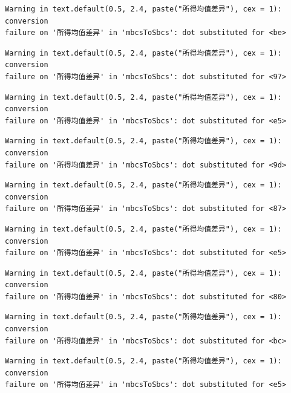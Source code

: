 \documentclass[
  letterpaper,
  DIV=11,
  numbers=noendperiod]{scrreprt}
\begin{document}
\begin{verbatim}
Warning in text.default(0.5, 2.4, paste("所得均值差异"), cex = 1): conversion
failure on '所得均值差异' in 'mbcsToSbcs': dot substituted for <be>
\end{verbatim}

\begin{verbatim}
Warning in text.default(0.5, 2.4, paste("所得均值差异"), cex = 1): conversion
failure on '所得均值差异' in 'mbcsToSbcs': dot substituted for <97>
\end{verbatim}

\begin{verbatim}
Warning in text.default(0.5, 2.4, paste("所得均值差异"), cex = 1): conversion
failure on '所得均值差异' in 'mbcsToSbcs': dot substituted for <e5>
\end{verbatim}

\begin{verbatim}
Warning in text.default(0.5, 2.4, paste("所得均值差异"), cex = 1): conversion
failure on '所得均值差异' in 'mbcsToSbcs': dot substituted for <9d>
\end{verbatim}

\begin{verbatim}
Warning in text.default(0.5, 2.4, paste("所得均值差异"), cex = 1): conversion
failure on '所得均值差异' in 'mbcsToSbcs': dot substituted for <87>
\end{verbatim}

\begin{verbatim}
Warning in text.default(0.5, 2.4, paste("所得均值差异"), cex = 1): conversion
failure on '所得均值差异' in 'mbcsToSbcs': dot substituted for <e5>
\end{verbatim}

\begin{verbatim}
Warning in text.default(0.5, 2.4, paste("所得均值差异"), cex = 1): conversion
failure on '所得均值差异' in 'mbcsToSbcs': dot substituted for <80>
\end{verbatim}

\begin{verbatim}
Warning in text.default(0.5, 2.4, paste("所得均值差异"), cex = 1): conversion
failure on '所得均值差异' in 'mbcsToSbcs': dot substituted for <bc>
\end{verbatim}

\begin{verbatim}
Warning in text.default(0.5, 2.4, paste("所得均值差异"), cex = 1): conversion
failure on '所得均值差异' in 'mbcsToSbcs': dot substituted for <e5>
\end{verbatim}
\end{document}

